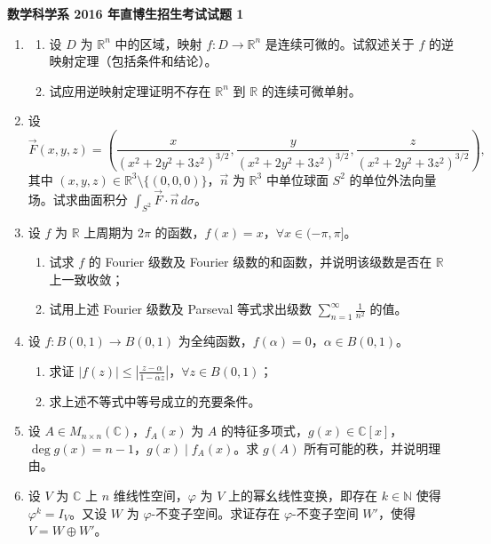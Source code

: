 \documentclass[UTF8,11pt,fontset=none]{ctexart}
\newcommand{\paperheading}[1]{\begin{center}\Large\bfseries #1\end{center}\vspace{.45em}}
\newcommand{\newpaper}[1]{\clearpage\paperheading{#1}}
\begin{document}
\newpaper{数学科学系 2016 年直博生招生考试试题 1}
\begin{enumerate}
\item
\begin{enumerate}
\item 设 $D$ 为 $\mathbb R^n$ 中的区域，映射 $f:D\to\mathbb R^n$ 是连续可微的。试叙述关于 $f$ 的逆映射定理（包括条件和结论）。
\item 试应用逆映射定理证明不存在 $\mathbb R^n$ 到 $\mathbb R$ 的连续可微单射。
\end{enumerate}
\item 设
\[
\vec F(x,y,z)=
\left(
\frac{x}{(x^2+2y^2+3z^2)^{3/2}},
\frac{y}{(x^2+2y^2+3z^2)^{3/2}},
\frac{z}{(x^2+2y^2+3z^2)^{3/2}}
\right),
\]
其中 $(x,y,z)\in\mathbb R^3\setminus\{(0,0,0)\}$，$\vec n$ 为 $\mathbb R^3$ 中单位球面 $S^2$ 的单位外法向量场。试求曲面积分 $\displaystyle\int_{S^2}\vec F\cdot\vec n\,d\sigma$。
\item 设 $f$ 为 $\mathbb R$ 上周期为 $2\pi$ 的函数，$f(x)=x$，$\forall x\in(-\pi,\pi]$。
\begin{enumerate}
\item 试求 $f$ 的 Fourier 级数及 Fourier 级数的和函数，并说明该级数是否在 $\mathbb R$ 上一致收敛；
\item 试用上述 Fourier 级数及 Parseval 等式求出级数 $\displaystyle\sum_{n=1}^{\infty}\frac1{n^2}$ 的值。
\end{enumerate}
\item 设 $f:B(0,1)\to B(0,1)$ 为全纯函数，$f(\alpha)=0$，$\alpha\in B(0,1)$。
\begin{enumerate}
\item 求证 $\displaystyle |f(z)|\le\left|\frac{z-\alpha}{1-\overline\alpha z}\right|$，$\forall z\in B(0,1)$；
\item 求上述不等式中等号成立的充要条件。
\end{enumerate}
\item 设 $A\in M_{n\times n}(\mathbb C)$，$f_A(x)$ 为 $A$ 的特征多项式，$g(x)\in\mathbb C[x]$，$\deg g(x)=n-1$，$g(x)\mid f_A(x)$。求 $g(A)$ 所有可能的秩，并说明理由。
\item 设 $V$ 为 $\mathbb C$ 上 $n$ 维线性空间，$\varphi$ 为 $V$ 上的幂幺线性变换，即存在 $k\in\mathbb N$ 使得 $\varphi^k=I_V$。又设 $W$ 为 $\varphi$-不变子空间。求证存在 $\varphi$-不变子空间 $W'$，使得 $V=W\oplus W'$。
\end{enumerate}
\end{document}
